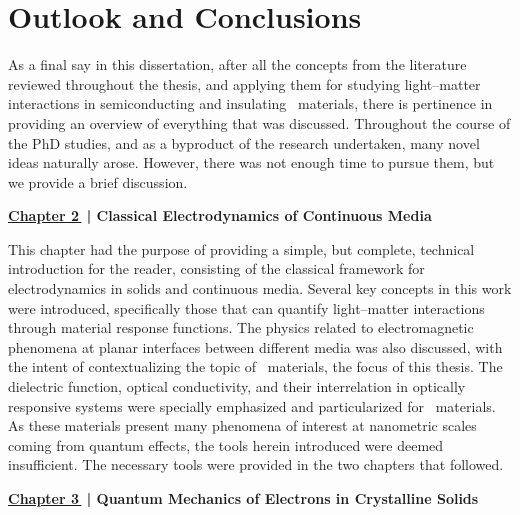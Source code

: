 
%

\chapter{Outlook and Conclusions}
\label{ch:Outlook}
\glsresetall
As a final say in this dissertation, after all the concepts from the literature reviewed throughout the thesis, and applying them for studying light--matter interactions in semiconducting and insulating \bd~materials, there is pertinence in providing an overview of everything that was discussed.
Throughout the course of the PhD studies, and as a byproduct of the research undertaken, many novel ideas naturally arose.
However, there was not enough time to pursue them, but we provide a brief discussion.

\noindent
\textbf{\hyperref[ch:classical_electrodynamics]{Chapter 2\,} \textcolor{black}{|} Classical Electrodynamics of Continuous Media}

This chapter had the purpose of providing a simple, but complete, technical introduction for the reader, consisting of the classical framework for electrodynamics in solids and continuous media.
Several key concepts in this work were introduced, specifically those that can quantify light--matter interactions through material response functions.
The physics related to electromagnetic phenomena at planar interfaces between different media was also discussed, with the intent of contextualizing the topic of \bd~materials, the focus of this thesis.
The dielectric function, optical conductivity, and their interrelation in optically responsive systems were specially emphasized and particularized for \bd~materials.
As these materials present many phenomena of interest at nanometric scales coming from quantum effects, the tools herein introduced were deemed insufficient.
The necessary tools were provided in the two chapters that followed.

\noindent
\textbf{\hyperref[ch:quantum_mechanics_solids]{Chapter 3\,}  \textcolor{black}{|} Quantum Mechanics of Electrons in Crystalline Solids}

